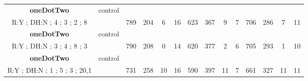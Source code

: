 \begin{table}[]
{\begin{tabular}{|c|c|c|c|c|c|c|c|c|c|c|c|c|c|}
\cellcolor{blue!15}\textbf{oneDotTwo} & control& {\color[HTML]{00009B} } & {\color[HTML]{9A0000} } & {\color[HTML]{009901} } &  & {\color[HTML]{00009B} } & {\color[HTML]{9A0000} } & {\color[HTML]{009901} } &  & {\color[HTML]{00009B} } & {\color[HTML]{9A0000} } & {\color[HTML]{009901} } &  \\ 
\cellcolor{ blue!15}R:Y ; DH:N ; 4 ; 3 ; 2 ; 8 &  & \multirow{-2}{*}{{\color[HTML]{00009B} 789}} & \multirow{-2}{*}{{\color[HTML]{9A0000} 204}} & \multirow{-2}{*}{{\color[HTML]{009901} 6}} & \multirow{-2}{*}{16} & \multirow{-2}{*}{{\color[HTML]{00009B} 623}} & \multirow{-2}{*}{{\color[HTML]{9A0000} 367}} & \multirow{-2}{*}{{\color[HTML]{009901} 9}} & \multirow{-2}{*}{7} & \multirow{-2}{*}{{\color[HTML]{00009B} 706}} & \multirow{-2}{*}{{\color[HTML]{9A0000} 286}} & \multirow{-2}{*}{{\color[HTML]{009901} 7}} & \multirow{-2}{*}{11} \\ \hline

\cellcolor{blue!15}\textbf{oneDotTwo} & control& {\color[HTML]{00009B} } & {\color[HTML]{9A0000} } & {\color[HTML]{009901} } &  & {\color[HTML]{00009B} } & {\color[HTML]{9A0000} } & {\color[HTML]{009901} } &  & {\color[HTML]{00009B} } & {\color[HTML]{9A0000} } & {\color[HTML]{009901} } &  \\ 
\cellcolor{ blue!15}R:Y ; DH:N ; 3 ; 4 ; 8 ; 3 &  & \multirow{-2}{*}{{\color[HTML]{00009B} 790}} & \multirow{-2}{*}{{\color[HTML]{9A0000} 208}} & \multirow{-2}{*}{{\color[HTML]{009901} 0}} & \multirow{-2}{*}{14} & \multirow{-2}{*}{{\color[HTML]{00009B} 620}} & \multirow{-2}{*}{{\color[HTML]{9A0000} 377}} & \multirow{-2}{*}{{\color[HTML]{009901} 2}} & \multirow{-2}{*}{6} & \multirow{-2}{*}{{\color[HTML]{00009B} 705}} & \multirow{-2}{*}{{\color[HTML]{9A0000} 293}} & \multirow{-2}{*}{{\color[HTML]{009901} 1}} & \multirow{-2}{*}{10} \\ \hline

\cellcolor{blue!15}\textbf{oneDotTwo} & control& {\color[HTML]{00009B} } & {\color[HTML]{9A0000} } & {\color[HTML]{009901} } &  & {\color[HTML]{00009B} } & {\color[HTML]{9A0000} } & {\color[HTML]{009901} } &  & {\color[HTML]{00009B} } & {\color[HTML]{9A0000} } & {\color[HTML]{009901} } &  \\ 
\cellcolor{ blue!15}R:Y ; DH:N ; 1 ; 5 ; 3 ; 20,1 &  & \multirow{-2}{*}{{\color[HTML]{00009B} 731}} & \multirow{-2}{*}{{\color[HTML]{9A0000} 258}} & \multirow{-2}{*}{{\color[HTML]{009901} 10}} & \multirow{-2}{*}{16} & \multirow{-2}{*}{{\color[HTML]{00009B} 590}} & \multirow{-2}{*}{{\color[HTML]{9A0000} 397}} & \multirow{-2}{*}{{\color[HTML]{009901} 11}} & \multirow{-2}{*}{7} & \multirow{-2}{*}{{\color[HTML]{00009B} 661}} & \multirow{-2}{*}{{\color[HTML]{9A0000} 327}} & \multirow{-2}{*}{{\color[HTML]{009901} 11}} & \multirow{-2}{*}{11} \\ \hline


\end{tabular}}
\end{table}
